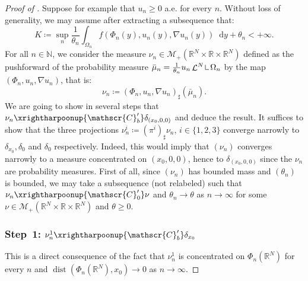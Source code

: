 \documentclass[10pt]{amsart}
\theoremstyle{plain}
\theoremstyle{definition}
\newcommand{\dd}{\mathop{}\mathopen{}\mathrm{d}}
\newcommand{\N}{\mathbb{N}}
\newcommand{\R}{\mathbb{R}}
\newcommand{\Cspace}{\mathscr{C}}
\newcommand{\Mspace}{\mathscr{M}}
\newcommand{\mres}{\mathop{\hbox{\vrule height 6pt width .5pt depth 0pt \vrule height .5pt width 4pt depth 0pt}}\nolimits}
\DeclareMathOperator{\lbm}{\mathcal{L}}
\DeclareMathOperator{\dist}{dist}
\newcommand{\mweakto}{\xrightharpoonup{\Cspace_0'}}
\newcommand{\narrowto}{\xrightharpoonup{\Cspace_b'}}
\begin{document}
\begin{proof}[Proof of ]
Suppose for example that $u_n \geq 0$ a.e. for every $n$. Without loss of generality, we may assume after extracting a subsequence that:
\begin{equation}\label{boundEnergyMass}
K \coloneqq \sup_n \frac 1{\theta_n} \int_{\Omega_n} f(\Phi_n(y), u_n(y), \nabla u_n(y))\dd y + \theta_n < +\infty.
\end{equation}
For all $n\in\N$, we consider the measure $\nu_n\in \Mspace_+(\R^N \times \R \times \R^N)$ defined as the pushforward of the probability measure $\bar\mu_n = \frac 1{\theta_n}u_n \lbm^N \mres \Omega_n$ by the map $(\Phi_n, u_n,\nabla u_n)$, that is:
\[\nu_n \coloneqq (\Phi_n, u_n,\nabla u_n)_\sharp (\bar\mu_n).\]
We are going to show in several steps that $\nu_n \narrowto \delta_{(x_0,0,0)}$ and deduce the result. It suffices to show that the three projections $\nu^i_n \coloneqq (\pi^i)_\sharp \nu_n$, $i\in\{1,2,3\}$ converge narrowly to $\delta_{x_0}, \delta_0$ and $\delta_0$ respectively. Indeed, this would imply that $(\nu_n)$ converges narrowly to a measure concentrated on $(x_0,0,0)$, hence to $\delta_{(x_0,0,0)}$ since the $\nu_n$ are probability measures. First of all, since $(\nu_n)$ has bounded mass and $(\theta_n)$ is bounded, we may take a subsequence (not relabeled) such that $\nu_n \mweakto \nu $ and $\theta_n \to \theta$ as \(n\to\infty\) for some $\nu \in \Mspace_+(\R^N \times \R\times \R^N)$ and $\theta \geq 0$.

\subsubsection*{Step~1: $\nu_n^1 \narrowto \delta_{x_0}$} This is a direct consequence of the fact that $\nu_n^1$ is concentrated on $\Phi_n(\R^N)$ for every $n$ and $\dist(\Phi_n(\R^N),x_0) \to 0$ as \(n\to\infty\).


\end{proof}
\end{document}
